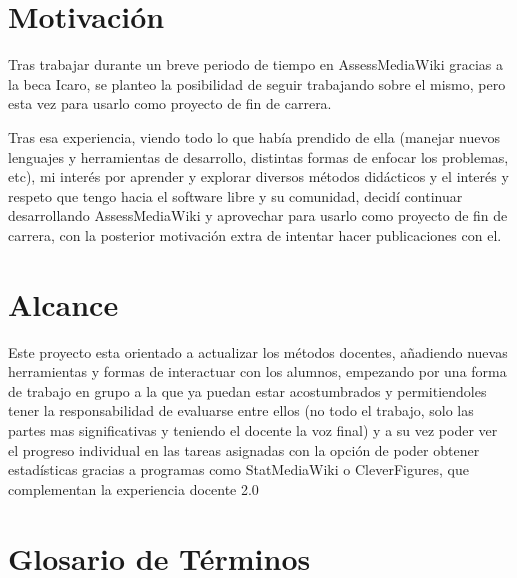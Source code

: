 

\section{Motivación}
Tras trabajar durante un breve periodo de tiempo en AssessMediaWiki gracias a la beca Icaro, se planteo la posibilidad de seguir trabajando sobre el mismo, pero esta vez para usarlo como proyecto de fin de carrera.
\newline

Tras esa experiencia, viendo todo lo que había prendido de ella (manejar nuevos lenguajes y herramientas de desarrollo, distintas formas de enfocar los problemas, etc), mi interés por aprender y explorar diversos métodos didácticos y el interés y respeto que tengo hacia el software libre y su comunidad, decidí continuar desarrollando AssessMediaWiki y aprovechar para usarlo como proyecto de fin de carrera, con la posterior motivación extra de intentar hacer publicaciones con el.

\section{Alcance} 

Este proyecto esta orientado a actualizar los métodos docentes, añadiendo nuevas herramientas y formas de interactuar con los alumnos, empezando por una forma de trabajo en grupo a la que ya puedan estar acostumbrados y permitiendoles tener la responsabilidad de evaluarse entre ellos (no todo el trabajo, solo las partes mas significativas y teniendo el docente la voz final) y a su vez poder ver el progreso individual en las tareas asignadas con la opción de poder obtener estadísticas gracias a programas como StatMediaWiki o CleverFigures, que complementan la experiencia docente 2.0

\section{Glosario de Términos} 

